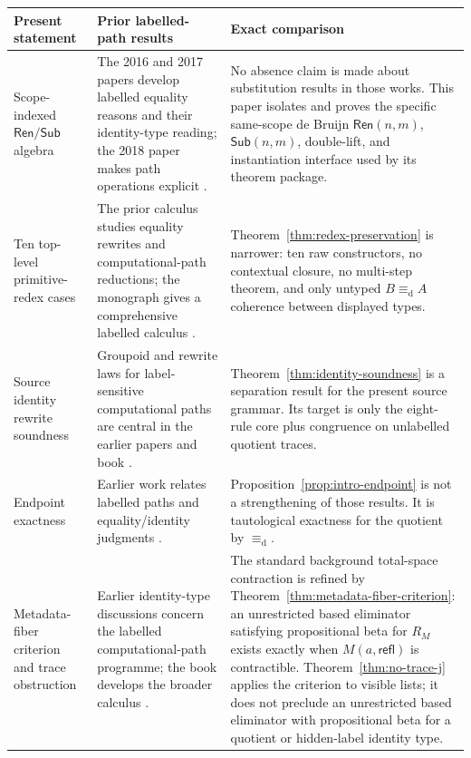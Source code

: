 \documentclass[10pt,reqno]{amsart}
\newcommand{\Ren}{\mathsf{Ren}}
\newcommand{\Sub}{\mathsf{Sub}}
\newcommand{\defeq}{\mathrel{\equiv_{\mathrm d}}}
\begin{document}
\begin{table}[ht]
\centering
\scriptsize
\renewcommand{\arraystretch}{1.18}
\begin{tabular}{>{\raggedright\arraybackslash}p{}
                >{\raggedright\arraybackslash}p{}
                >{\raggedright\arraybackslash}p{}}
\toprule
Present statement & Prior labelled-path results & Exact comparison\\
\midrule
Scope-indexed \(\Ren/\Sub\) algebra
& The 2016 and 2017 papers develop labelled equality reasons and their
  identity-type reading; the 2018 paper makes path operations explicit
  \cite{deQueirozEtAl2016,RamosEtAl2017,RamosEtAl2018}.
& No absence claim is made about substitution results in those works.
  This paper isolates and proves the specific same-scope de Bruijn
  \(\Ren(n,m)\), \(\Sub(n,m)\), double-lift, and instantiation interface used
  by its theorem package.\\

Ten top-level primitive-redex cases
& The prior calculus studies equality rewrites and computational-path
  reductions; the monograph gives a comprehensive labelled calculus
  \cite{RamosEtAl2026}.
& Theorem~\ref{thm:redex-preservation} is narrower: ten raw constructors,
  no contextual closure, no multi-step theorem, and only untyped
  \(B\defeq A\) coherence between displayed types.\\

Source identity rewrite soundness
& Groupoid and rewrite laws for label-sensitive computational paths are
  central in the earlier papers and book
  \cite{RamosEtAl2017,RamosEtAl2018,deVerasEtAl2025,RamosEtAl2026}.
& Theorem~\ref{thm:identity-soundness} is a separation result for the
  present source grammar.  Its target is only the eight-rule core plus
  congruence on unlabelled quotient traces.\\

Endpoint exactness
& Earlier work relates labelled paths and equality/identity judgments
  \cite{deQueirozEtAl2016,RamosEtAl2017}.
& Proposition~\ref{prop:intro-endpoint} is not a strengthening of those
  results.  It is tautological exactness for the quotient by \(\defeq\).\\

Metadata-fiber criterion and trace obstruction
& Earlier identity-type discussions concern the labelled computational-path
  programme; the book develops the broader calculus
  \cite{RamosEtAl2017,RamosEtAl2026}.
& The standard background total-space contraction is refined by
  Theorem~\ref{thm:metadata-fiber-criterion}:
  an unrestricted based eliminator satisfying propositional beta for \(R_M\)
  exists exactly when
  \(M(a,\mathsf{refl})\) is contractible.
  Theorem~\ref{thm:no-trace-j} applies the criterion to visible lists; it
  does not preclude an unrestricted based eliminator with propositional beta
  for a quotient or hidden-label identity type.\\


\end{tabular}
\end{table}
\end{document}
